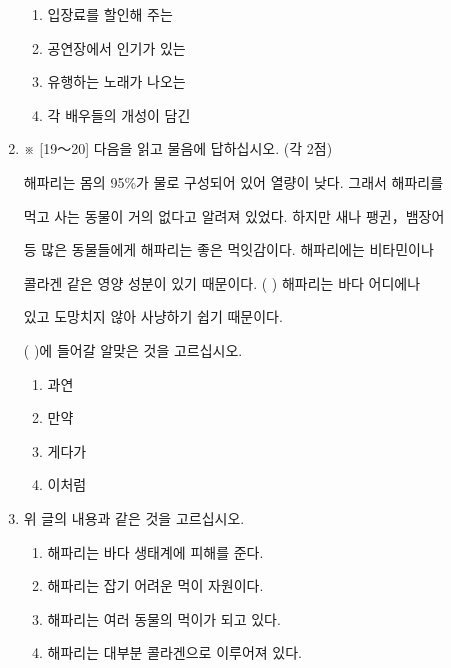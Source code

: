 \documentclass[12pt]{article}
\begin{document}
\begin{enumerate}[1.]
    \begin{enumerate}[1)]
        \item 입장료를 할인해 주는
        \item 공연장에서 인기가 있는
        \item 유행하는 노래가 나오는
        \item 각 배우들의 개성이 담긴
    \end{enumerate}



    \item ※ [19～20] 다음을 읽고 물음에 답하십시오. (각 2점)

    \begin{mdframed}
    해파리는 몸의 95\%가 물로 구성되어 있어 열량이 낮다. 그래서 해파리를

    먹고 사는 동물이 거의 없다고 알려져 있었다. 하지만 새나 팽귄，뱀장어

    등 많은 동물들에게 해파리는 좋은 먹잇감이다. 해파리에는 비타민이나

    콜라겐 같은 영양 성분이 있기 때문이다. (      ) 해파리는 바다 어디에나

    있고 도망치지 않아 사냥하기 쉽기 때문이다.
    \end{mdframed}

    \bigskip

    (   )에 들어갈 알맞은 것을 고르십시오.

    \bigskip

    \begin{enumerate}[1)]
        \item 과연
        \item 만약
        \item 게다가
        \item 이처럼
    \end{enumerate}


    \item 위 글의 내용과 같은 것을 고르십시오.

    \begin{enumerate}[1)]
        \item 해파리는 바다 생태계에 피해를 준다.
        \item 해파리는 잡기 어려운 먹이 자원이다.
        \item 해파리는 여러 동물의 먹이가 되고 있다.
        \item 해파리는 대부분 콜라겐으로 이루어져 있다.
    \end{enumerate}




\end{enumerate}
\end{document}
